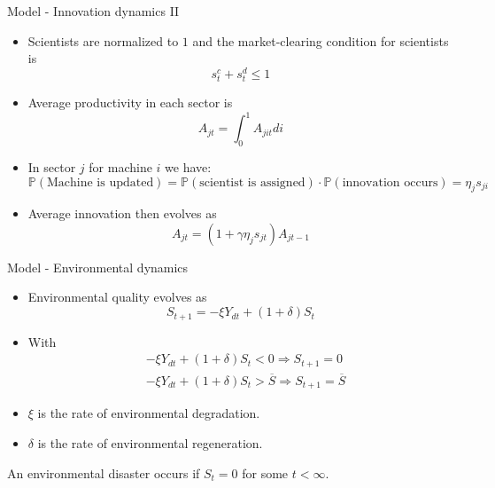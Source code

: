 \documentclass[aspectratio=169,xcolor=dvipsnames]{beamer}
\begin{document}
\begin{frame}{Model - Innovation dynamics II}
    \begin{itemize}
\item Scientists are normalized to $1$ and the market-clearing condition for scientists is
        \begin{equation}
            s_{t}^c + {s}_{t}^d\leq1
        \end{equation}
\item Average productivity in each sector is
        \begin{equation}
            A_{jt}= \int_0^1 A_{jit}di
        \end{equation}
\item In sector $j$ for machine $i$ we have:
        \begin{equation*}
        \mathbb{P}(\text{Machine is updated})=\mathbb{P}(\text{scientist is assigned})\cdot \mathbb{P}(\text{innovation occurs})= \eta_{j}s_{ji}
        \end{equation*}
\item Average innovation then evolves as 
        \begin{equation}
            A_{jt}= (1+\gamma \eta_j s_{jt}) A_{jt-1}
        \end{equation}
    \end{itemize}
\end{frame}


\begin{frame}{Model - Environmental dynamics}
    \begin{itemize}
\item Environmental quality evolves as 
        \begin{equation*}
        S_{t+1} = - \xi Y_{dt} + (1+\delta)S_t
        \end{equation*}
\item With
        \begin{align*}
& - \xi Y_{dt} + (1+\delta)S_t < 0 \Rightarrow S_{t+1}=0\\
& - \xi Y_{dt} + (1+\delta)S_t > \overline{S} \Rightarrow S_{t+1}=\overline{S}
        \end{align*}
\item $\xi$ is the rate of environmental degradation.
\item $\delta$ is the rate of environmental regeneration.
        \end{itemize}
        \begin{definition}
        An environmental disaster occurs if $S_t=0$ for some $t < \infty$. 
        \end{definition}
\end{frame}
\end{document}
